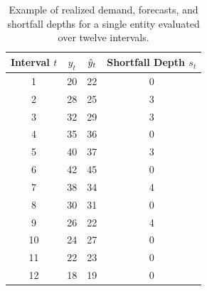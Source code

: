 \begin{table}[h!]
\centering
\begin{tabular}{c c c c}
\hline
Interval $t$ & $y_t$ & $\hat{y}_t$ & Shortfall Depth $s_t$ \\
\hline
1  & 20 & 22 & 0 \\
2  & 28 & 25 & 3 \\
3  & 32 & 29 & 3 \\
4  & 35 & 36 & 0 \\
5  & 40 & 37 & 3 \\
6  & 42 & 45 & 0 \\
7  & 38 & 34 & 4 \\
8  & 30 & 31 & 0 \\
9  & 26 & 22 & 4 \\
10 & 24 & 27 & 0 \\
11 & 22 & 23 & 0 \\
12 & 18 & 19 & 0 \\
\hline
\end{tabular}
\caption{Example of realized demand, forecasts, and shortfall depths for a single
entity evaluated over twelve intervals.}
\label{tab:ud_example}
\end{table}
